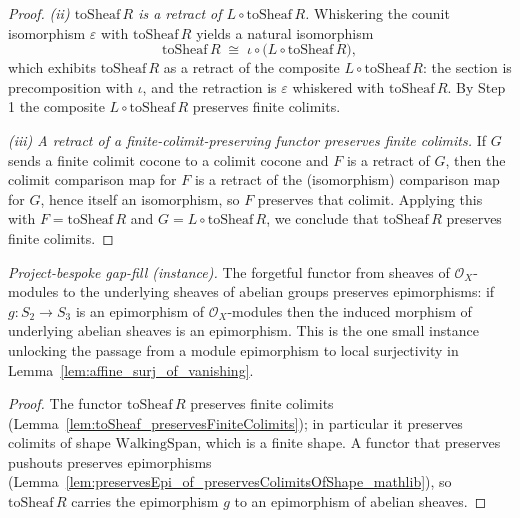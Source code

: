 \begin{proof}
  \emph{(ii) \(\mathrm{toSheaf}\,R\) is a retract of \(L \circ \mathrm{toSheaf}\,R\).} Whiskering the
  counit isomorphism \(\varepsilon\) with \(\mathrm{toSheaf}\,R\) yields a natural isomorphism
  \[
    \mathrm{toSheaf}\,R \;\cong\; \iota \circ \bigl(L \circ \mathrm{toSheaf}\,R\bigr),
  \]
  which exhibits \(\mathrm{toSheaf}\,R\) as a retract of the composite \(L \circ \mathrm{toSheaf}\,R\):
  the section is precomposition with \(\iota\), and the retraction is \(\varepsilon\) whiskered with
  \(\mathrm{toSheaf}\,R\). By Step 1 the composite \(L \circ \mathrm{toSheaf}\,R\) preserves finite
  colimits.

  \emph{(iii) A retract of a finite-colimit-preserving functor preserves finite colimits.} If \(G\)
  sends a finite colimit cocone to a colimit cocone and \(F\) is a retract of \(G\), then the colimit
  comparison map for \(F\) is a retract of the (isomorphism) comparison map for \(G\), hence itself an
  isomorphism, so \(F\) preserves that colimit. Applying this with \(F = \mathrm{toSheaf}\,R\) and
  \(G = L \circ \mathrm{toSheaf}\,R\), we conclude that \(\mathrm{toSheaf}\,R\) preserves finite
  colimits.
\end{proof}

\begin{lemma}
  \label{lem:to_sheaf_preserves_epi}
  \textit{Project-bespoke gap-fill (instance).}
  The forgetful functor from sheaves of \(\mathcal{O}_X\)-modules to the underlying sheaves of
  abelian groups preserves epimorphisms: if \(g : S_2 \to S_3\) is an epimorphism of
  \(\mathcal{O}_X\)-modules then the induced morphism of underlying abelian sheaves is an
  epimorphism. This is the one small instance unlocking the passage from a module epimorphism to
  local surjectivity in Lemma~\ref{lem:affine_surj_of_vanishing}.
\end{lemma}
\begin{proof}
  The functor \(\mathrm{toSheaf}\,R\) preserves finite colimits
  (Lemma~\ref{lem:toSheaf_preservesFiniteColimits}); in particular it preserves colimits of shape
  \(\mathrm{WalkingSpan}\), which is a finite shape. A functor that preserves pushouts preserves
  epimorphisms (Lemma~\ref{lem:preservesEpi_of_preservesColimitsOfShape_mathlib}), so
  \(\mathrm{toSheaf}\,R\) carries the epimorphism \(g\) to an epimorphism of abelian sheaves.
\end{proof}

